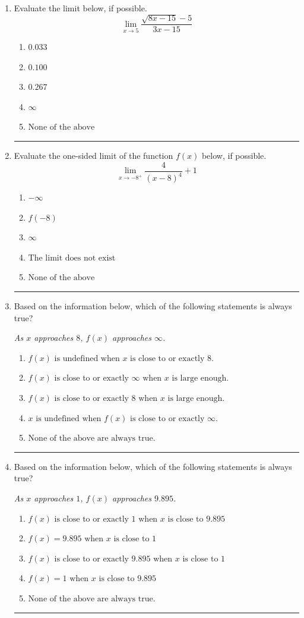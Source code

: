 \documentclass[14pt]{extbook}
\newcommand{\litem}[1]{\item#1\hspace*{-1cm}\rule{\textwidth}{0.4pt}}
\begin{document}
\begin{enumerate}
\litem{
Evaluate the limit below, if possible.\[ \lim_{x \rightarrow 5} \frac{\sqrt{8x - 15} - 5}{3x - 15} \]\begin{enumerate}[label=\Alph*.]
\item \( 0.033 \)
\item \( 0.100 \)
\item \( 0.267 \)
\item \( \infty \)
\item \( \text{None of the above} \)

\end{enumerate} }
\litem{
Evaluate the one-sided limit of the function $f(x)$ below, if possible.\[ \lim_{x \rightarrow -8^+} \frac{4}{(x-8)^4}+1 \]\begin{enumerate}[label=\Alph*.]
\item \( -\infty \)
\item \( f(-8) \)
\item \( \infty \)
\item \( \text{The limit does not exist} \)
\item \( \text{None of the above} \)

\end{enumerate} }
\litem{
Based on the information below, which of the following statements is always true?
\begin{center}
    \textit{ As $x$ approaches $8$, $f(x)$ approaches $\infty$. }
\end{center}
\begin{enumerate}[label=\Alph*.]
\item \( f(x) \text{ is undefined when } x \text{ is close to or exactly } 8. \)
\item \( f(x) \text{ is close to or exactly } \infty \text{ when } x \text{ is large enough}. \)
\item \( f(x) \text{ is close to or exactly } 8 \text{ when } x \text{ is large enough}. \)
\item \( x \text{ is undefined when } f(x) \text{ is close to or exactly } \infty. \)
\item \( \text{None of the above are always true.} \)

\end{enumerate} }
\litem{
Based on the information below, which of the following statements is always true?
\begin{center}
    \textit{ As $x$ approaches $1$, $f(x)$ approaches $9.895$. }
\end{center}
\begin{enumerate}[label=\Alph*.]
\item \( f(x) \text{ is close to or exactly } 1 \text{ when } x \text{ is close to } 9.895 \)
\item \( f(x) = 9.895 \text{ when } x \text{ is close to } 1 \)
\item \( f(x) \text{ is close to or exactly } 9.895 \text{ when } x \text{ is close to } 1 \)
\item \( f(x) = 1 \text{ when } x \text{ is close to } 9.895 \)
\item \( \text{None of the above are always true.} \)


\end{enumerate}}
\end{enumerate}
\end{document}

